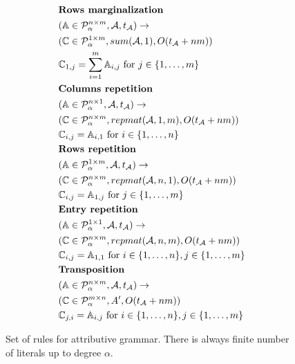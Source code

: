 \begin{figure}
\begin{framed}
\begin{align*}
&\text{{\bf Rows marginalization}}\\
&(\mathbb{A} \in \mathcal{P}^{n \times m}_\alpha, \mathcal{A}, t_\mathcal{A}) \rightarrow \\ 
&(\mathbb{C} \in \mathcal{P}^{1 \times m}_\alpha, sum(\mathcal{A}, 1), O(t_\mathcal{A} + nm)) \\
&\mathbb{C}_{1, j} = \sum_{i = 1}^m \mathbb{A}_{i, j} \text{ for } j \in \{1, \dots, m\}\\
&\text{{\bf Columns repetition}}\\
&(\mathbb{A} \in \mathcal{P}^{n \times 1}_\alpha, \mathcal{A}, t_\mathcal{A}) \rightarrow \\ 
&(\mathbb{C} \in \mathcal{P}^{n \times m}_\alpha, repmat(\mathcal{A}, 1, m), O(t_\mathcal{A} + nm)) \\
&\mathbb{C}_{i, j} = \mathbb{A}_{i, 1} \text{ for } i \in \{1, \dots, n\}\\
&\text{{\bf Rows repetition}}\\
&(\mathbb{A} \in \mathcal{P}^{1 \times m}_\alpha, \mathcal{A}, t_\mathcal{A}) \rightarrow \\ 
&(\mathbb{C} \in \mathcal{P}^{n \times m}_\alpha, repmat(\mathcal{A}, n, 1), O(t_\mathcal{A} + nm)) \\
&\mathbb{C}_{i, j} = \mathbb{A}_{1, j} \text{ for } j \in \{1, \dots, m\}\\
&\text{{\bf Entry repetition}}\\
&(\mathbb{A} \in \mathcal{P}^{1 \times 1}_\alpha, \mathcal{A}, t_\mathcal{A}) \rightarrow \\ 
&(\mathbb{C} \in \mathcal{P}^{n \times m}_\alpha, repmat(\mathcal{A}, n, m), O(t_\mathcal{A} + nm)) \\
&\mathbb{C}_{i, j} = \mathbb{A}_{1, 1} \text{ for } i \in \{1, \dots, n\}, j \in \{1, \dots, m\}\\
&\text{{\bf Transposition}}\\
&(\mathbb{A} \in \mathcal{P}^{n \times m}_\alpha, \mathcal{A}, t_\mathcal{A}) \rightarrow \\ 
&(\mathbb{C} \in \mathcal{P}^{m \times n}_\alpha, A', O(t_\mathcal{A} + nm)) \\
&\mathbb{C}_{j, i} = \mathbb{A}_{i, j} \text{ for } i \in \{1, \dots, n\}, j \in \{1, \dots, m\} \\
\end{align*}
\caption{Set of rules for attributive grammar. There is always finite number of literals up to degree $\alpha$.}
\end{framed}
\label{rules}
\end{figure}


